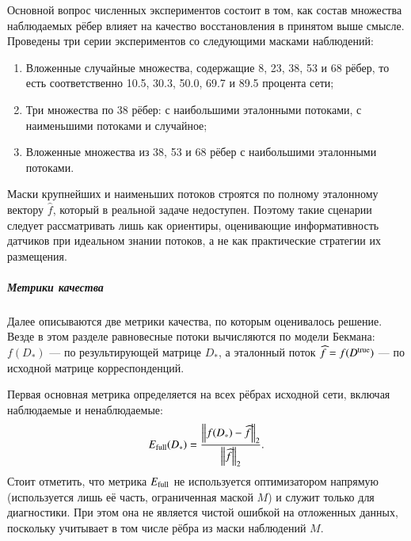 \documentclass{crm-article}
\begin{document}
Основной вопрос численных экспериментов состоит в том, как состав множества
наблюдаемых рёбер влияет на качество восстановления в принятом выше смысле.
Проведены три серии экспериментов со следующими масками наблюдений:
\begin{enumerate}
\item Вложенные случайные множества, содержащие 8, 23, 38, 53 и 68 рёбер, то
есть соответственно 10.5, 30.3, 50.0, 69.7 и 89.5 процента сети;
\item Три множества по 38 рёбер: с наибольшими эталонными потоками, с наименьшими потоками и случайное;
\item Вложенные множества из 38, 53 и 68 рёбер с наибольшими эталонными потоками.
\end{enumerate}

Маски крупнейших и наименьших потоков строятся по полному эталонному
вектору $\widehat f$, который в реальной задаче недоступен. Поэтому такие
сценарии следует рассматривать лишь как ориентиры, оценивающие
информативность датчиков при идеальном знании потоков, а не как
практические стратегии их размещения.
\subparagraph{Метрики качества}

Далее описываются две метрики качества, по которым оценивалось решение. Везде в этом разделе равновесные потоки вычисляются по модели Бекмана:
$f(D_*)$ --- по результирующей матрице $D_*$, а эталонный поток
$\widehat f=f(D^{\rm true})$ --- по исходной матрице корреспонденций. 

Первая основная метрика определяется на всех рёбрах исходной сети, включая
наблюдаемые и ненаблюдаемые:
\begin{gather}
 E_{\rm full}(D_*)=
 \frac{\left\|f(D_*)-\widehat f\right\|_2}
 {\left\|\widehat f\right\|_2}.
 \label{eq:full-flow-error}
\end{gather}
Стоит отметить, что метрика $E_{\rm full}$ не используется оптимизатором
напрямую (используется лишь её часть, ограниченная маской $M$) и служит
только для диагностики. При этом она не является чистой ошибкой на
отложенных данных, поскольку учитывает в том числе рёбра из маски
наблюдений $M$.
\end{document}
